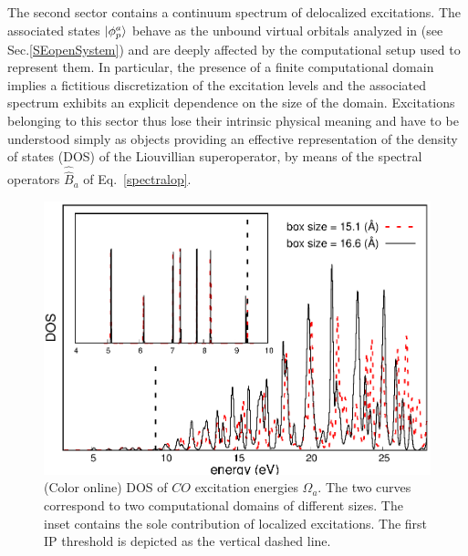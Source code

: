 \documentclass[reprint,aps,prb]{revtex4-1}
\newcommand{\op}[1]{\hat {#1}}
\newcommand{\sop}[1]{\op{\op {#1}}}
\begin{document}
The second sector contains a continuum spectrum of delocalized excitations. The associated states $\ket{\phi_p^a}$ behave as the unbound virtual orbitals analyzed in \cite{boffi2016} (see Sec.\ref{SEopenSystem})
and are deeply affected by the computational setup used to represent them. In particular, the presence of a finite computational domain implies a fictitious discretization of the excitation levels and
the associated spectrum exhibits an explicit dependence on the size of the domain.
Excitations belonging to this sector thus lose their intrinsic physical meaning and have to be understood simply as objects providing an effective representation of the density of states (DOS) of the Liouvillian superoperator, by means of the spectral operators $\sop B_a$ of Eq.~\eqref{spectralop}.

\begin{figure}[ht]
\includegraphics[scale=0.6]{Fig4_CO_dos_rev1.eps}
\caption{(Color online) DOS of $CO$ excitation energies $\Omega_a$. The two curves correspond to two computational domains of different sizes. The inset contains the sole contribution of localized excitations. The first IP threshold is depicted as the vertical dashed line.}
\label{CO_exc}
\end{figure}
\end{document}
